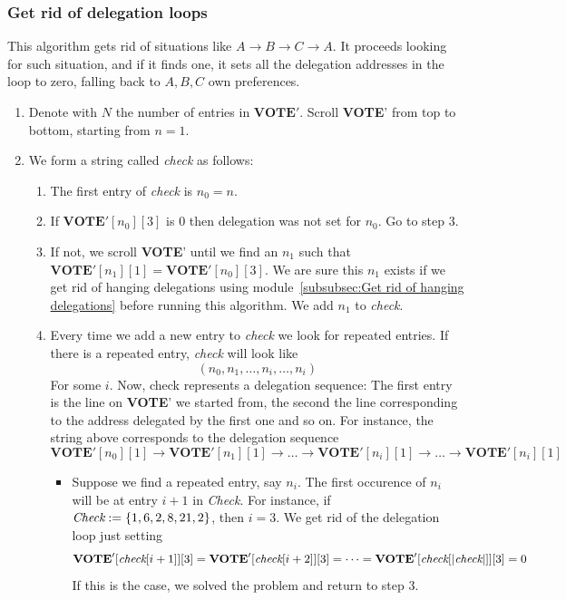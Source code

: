 \documentclass[submission, copyright,creativecommons,sharealike,noncommercial]{eptcs}
\newcommand{\Vote}{\textbf{VOTE}\xspace}
\begin{document}
\subsubsection{Get rid of delegation loops}\label{subsubsec:Get rid of delegation loops}
	This algorithm gets rid of situations like $A \to B \to C \to A$. It proceeds looking for such situation, and if it finds one, it sets all the delegation addresses in the loop to zero, falling back to $A,B,C$ own preferences.
	\begin{enumerate}
		\item Denote with $N$ the number of entries in $\Vote'$. Scroll \Vote' from top to bottom, starting from $n=1$.
		\item We form a string called \emph{check} as follows:
		\begin{enumerate}
			\item The first entry of \emph{check} is $n_0=n$.
			
			\item If $\Vote'[n_0][3]$ is $0$ then delegation was not set for $n_0$. Go to step $3$.

			\item If not, we scroll \Vote' until we find an $n_1$ such that $\Vote'[n_1][1] = \Vote'[n_0][3]$. We are sure this $n_1$ exists if we get rid of hanging delegations using module~\ref{subsubsec:Get rid of hanging delegations} before running this algorithm. We add $n_1$ to \emph{check}.
			
			\item Every time we add a new entry to \emph{check} we look for repeated entries. If there is a repeated entry, \emph{check} will look like
			\[
			(n_0,n_1,\dots, n_i, \dots, n_i)
			\]
			For some $i$. Now, check represents a delegation sequence: The first entry is the line on \Vote' we started from, the second the line corresponding to the address delegated by the first one and so on. For instance, the string above corresponds to the delegation sequence
			\[
			\Vote'[n_0][1] \to \Vote'[n_1][1] \to \dots \to \Vote'[n_i][1] \to \dots \to \Vote'[n_i][1]
			\]
			\begin{itemize}
				\item Suppose we find a repeated entry, say $n_i$. The first occurence of $n_i$ will be at entry $i+1$ in \emph{Check}. For instance, if $\emph{Check}:=\{1,6,2,8,21,2\}$, then $i=3$. We get rid of the delegation loop just setting 
				\[
				\Vote'[\emph{check}[i+1]][3]=\Vote'[\emph{check}[i+2]][3] = \dots = \Vote'[\emph{check}[|\emph{check}|]][3]=0
				\]
				If this is the case, we solved the problem and return to step $3$.
			

\end{itemize}
\end{enumerate}
\end{enumerate}
\end{document}
